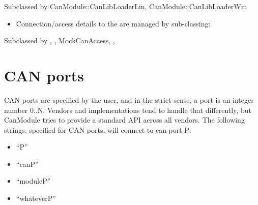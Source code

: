 \documentclass[letterpaper,10pt,english]{sphinxmanual}
\begin{document}
\begin{fulllineitems}
\label{\detokenize{standardApi:_CPPv4N9CanModule12CanLibLoaderE}}%
\pysigstartmultiline
{}\label{\detokenize{standardApi:classCanModule_1_1CanLibLoader}}%
\pysigstopmultiline
Subclassed by CanModule::CanLibLoaderLin, CanModule::CanLibLoaderWin

\end{fulllineitems}

\begin{itemize}
\item {} 
Connection/access details to the  are managed by sub-classing:

\end{itemize}

\begin{fulllineitems}
\label{\detokenize{standardApi:_CPPv4N9CanModule10CCanAccessE}}%
\pysigstartmultiline
{}\label{\detokenize{standardApi:classCanModule_1_1CCanAccess}}%
\pysigstopmultiline
Subclassed by {\hyperref[\detokenize{vendors/anagate:classAnaCanScan}]{}}, {\hyperref[\detokenize{vendors/systec:classCSockCanScan}]{}}, MockCanAccess, {\hyperref[\detokenize{vendors/peak:classPKCanScan}]{}}, {\hyperref[\detokenize{vendors/systec:classSTCanScan}]{}}

\end{fulllineitems}



\section{CAN ports}
\label{\detokenize{standardApi:can-ports}}
CAN ports are specified by the user, and in the strict sense, a port is an integer number 0..N.
Vendors and implementations tend to handle that differently, but CanModule tries to provide a
standard API across all vendors. The following strings, specified for CAN ports, will connect
to can port P:
\begin{itemize}
\item {} 
“P”

\item {} 
“canP”

\item {} 
“moduleP”

\item {} 
“whateverP”

\end{itemize}
\end{document}

